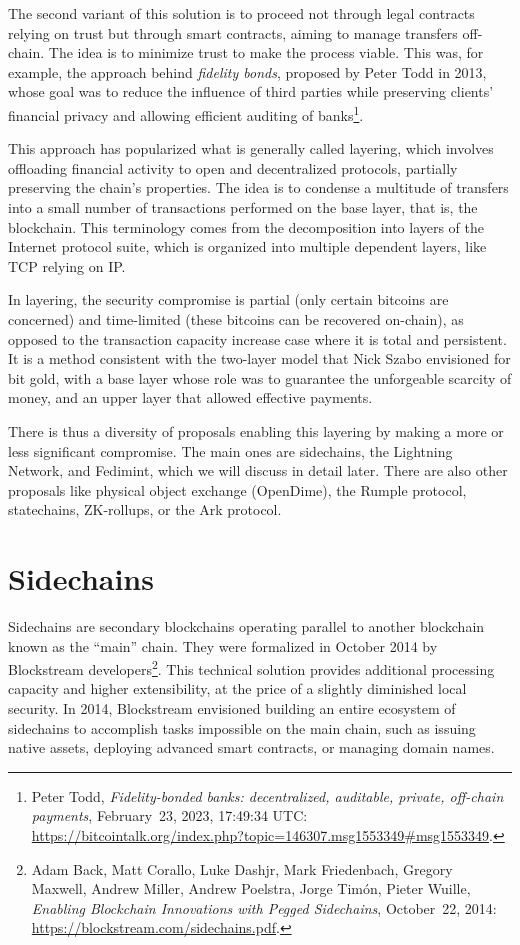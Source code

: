 \documentclass[
  a5paper,
  smalldemyvopaper,10pt,twoside,onecolumn,openright,extrafontsizes,hidelinks]{memoir}
\begin{document}
The second variant of this solution is to proceed not through legal
contracts relying on trust but through smart contracts, aiming to manage
transfers off-chain. The idea is to minimize trust to make the process
viable. This was, for example, the approach behind \emph{fidelity
bonds}, proposed by Peter Todd in 2013, whose goal was to reduce the
influence of third parties while preserving clients' financial privacy
and allowing efficient auditing of banks\footnote{Peter Todd,
  \emph{Fidelity-bonded banks: decentralized, auditable, private,
  off-chain payments}, February~23, 2023, 17:49:34 UTC:
  \url{https://bitcointalk.org/index.php?topic=146307.msg1553349\#msg1553349}.}.

This approach has popularized what is generally called layering, which
involves offloading financial activity to open and decentralized
protocols, partially preserving the chain's properties. The idea is to
condense a multitude of transfers into a small number of transactions
performed on the base layer, that is, the blockchain. This terminology
comes from the decomposition into layers of the Internet protocol suite,
which is organized into multiple dependent layers, like TCP relying on
IP.

In layering, the security compromise is partial (only certain bitcoins
are concerned) and time-limited (these bitcoins can be recovered
on-chain), as opposed to the transaction capacity increase case where it
is total and persistent. It is a method consistent with the two-layer
model that Nick Szabo envisioned for bit gold, with a base layer whose
role was to guarantee the unforgeable scarcity of money, and an upper
layer that allowed effective payments.

There is thus a diversity of proposals enabling this layering by making
a more or less significant compromise. The main ones are sidechains, the
Lightning Network, and Fedimint, which we will discuss in detail later.
There are also other proposals like physical object exchange (OpenDime),
the Rumple protocol, statechains, ZK-rollups, or the Ark protocol.

\section*{Sidechains}\label{sidechains}


Sidechains are secondary blockchains operating parallel to another
blockchain known as the ``main'' chain. They were formalized in October
2014 by Blockstream developers\footnote{Adam Back, Matt Corallo, Luke
  Dashjr, Mark Friedenbach, Gregory Maxwell, Andrew Miller, Andrew
  Poelstra, Jorge Timón, Pieter Wuille, \emph{Enabling Blockchain
  Innovations with Pegged Sidechains}, October~22, 2014:
  \url{https://blockstream.com/sidechains.pdf}.}. This technical
solution provides additional processing capacity and higher
extensibility, at the price of a slightly diminished local security. In
2014, Blockstream envisioned building an entire ecosystem of sidechains
to accomplish tasks impossible on the main chain, such as issuing native
assets, deploying advanced smart contracts, or managing domain names.
\end{document}
